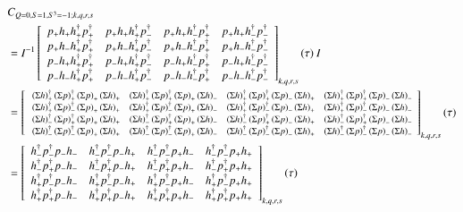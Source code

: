 \renewcommand{\cor}[4]{p_{#1}h_{#2}h^\dagger_{#3}p^\dagger_{#4}}
\newcommand{\dscor}[4]{\left(\Sigma h\right)_{#1}^\dagger \left(\Sigma p\right)_{#2}^\dagger \left(\Sigma p\right)_{#3}\left(\Sigma h\right)_{#4}}
\renewcommand{\dcor}[4]{h_{#1}^\dagger p_{#2}^\dagger p_{#3} h_{#4}}

\begin{equation}
  \begin{aligned}
    &C_{Q=0,S=1,S^3=-1;k,q,r,s} \\
    &= I^{-1} \left[ 
    {\begin{array}{cccc}
      \cor{+}{+}{+}{+} & \cor{+}{+}{+}{-} & \cor{+}{+}{-}{+} & \cor{+}{+}{-}{-} \\
      \cor{+}{-}{+}{+} & \cor{+}{-}{+}{-} & \cor{+}{-}{-}{+} & \cor{+}{-}{-}{-} \\
      \cor{-}{+}{+}{+} & \cor{-}{+}{+}{-} & \cor{-}{+}{-}{+} & \cor{-}{+}{-}{-} \\
      \cor{-}{-}{+}{+} & \cor{-}{-}{+}{-} & \cor{-}{-}{-}{+} & \cor{-}{-}{-}{-} \\
    \end{array} } \right]_{k,q,r,s} (\tau)\:I \\
    &= \left[\resizebox{\textwidth}{!}{
    ${\begin{array}{cccc}
      \dscor{+}{+}{+}{+} & \dscor{+}{+}{+}{-} & \dscor{+}{+}{-}{+} & \dscor{+}{+}{-}{-} \\
      \dscor{+}{-}{+}{+} & \dscor{+}{-}{+}{-} & \dscor{+}{-}{-}{+} & \dscor{+}{-}{-}{-} \\
      \dscor{-}{+}{+}{+} & \dscor{-}{+}{+}{-} & \dscor{-}{+}{-}{+} & \dscor{-}{+}{-}{-} \\
      \dscor{-}{-}{+}{+} & \dscor{-}{-}{+}{-} & \dscor{-}{-}{-}{+} & \dscor{-}{-}{-}{-} \\
    \end{array} }$}
    \right]_{k,q,r,s} (\tau) \\
    &= \left[ 
    {\begin{array}{cccc}
      \dcor{-}{-}{-}{-} & \dcor{-}{-}{-}{+} & \dcor{-}{-}{+}{-} & \dcor{-}{-}{+}{+} \\
      \dcor{-}{+}{-}{-} & \dcor{-}{+}{-}{+} & \dcor{-}{+}{+}{-} & \dcor{-}{+}{+}{+} \\
      \dcor{+}{-}{-}{-} & \dcor{+}{-}{-}{+} & \dcor{+}{-}{+}{-} & \dcor{+}{-}{+}{+} \\
      \dcor{+}{+}{-}{-} & \dcor{+}{+}{-}{+} & \dcor{+}{+}{+}{-} & \dcor{+}{+}{+}{+} \\
    \end{array} } 
    \right]_{k,q,r,s} (\tau) \\
  \end{aligned}
\end{equation}

